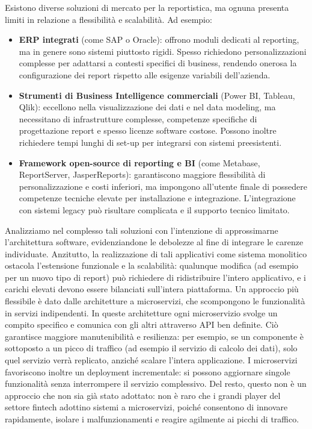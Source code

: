 Esistono diverse soluzioni di mercato per la reportistica, ma ognuna presenta limiti in relazione a flessibilità e scalabilità. Ad esempio:
\begin{itemize}
    \item \textbf{ERP integrati} (come SAP o Oracle): offrono moduli dedicati al reporting, ma in genere sono sistemi piuttosto rigidi. Spesso richiedono personalizzazioni complesse per adattarsi a contesti specifici di business, rendendo onerosa la configurazione dei report rispetto alle esigenze variabili dell’azienda.
    \item \textbf{Strumenti di Business Intelligence commerciali} (Power BI, Tableau, Qlik): eccellono nella visualizzazione dei dati e nel data modeling, ma necessitano di infrastrutture complesse, competenze specifiche di progettazione report e spesso licenze software costose. Possono inoltre richiedere tempi
    lunghi di set-up per integrarsi con sistemi preesistenti.
    \item \textbf{Framework open-source di reporting e BI} (come Metabase, ReportServer, JasperReports): garantiscono maggiore flessibilità di personalizzazione e costi inferiori, ma impongono all’utente finale di possedere competenze tecniche elevate per installazione e integrazione. L’integrazione con sistemi legacy può risultare complicata e il supporto tecnico limitato.
\end{itemize}

Analizziamo nel complesso tali soluzioni con l'intenzione di approssimarne l'architettura software, evidenziandone le debolezze al fine di integrare le carenze individuate.
Anzitutto, la realizzazione di tali applicativi come sistema monolitico ostacola l’estensione funzionale e la scalabilità: qualunque modifica (ad esempio per un nuovo tipo di report) può richiedere di ridistribuire l’intero applicativo, e i carichi elevati devono essere bilanciati sull’intera piattaforma. Un approccio più flessibile è dato dalle architetture a microservizi, che scompongono le funzionalità in servizi indipendenti. In queste architetture ogni microservizio svolge un compito specifico e comunica con gli altri attraverso API ben definite. Ciò garantisce maggiore manutenibilità e resilienza: per esempio, se un componente è sottoposto a un picco di traffico (ad esempio il servizio di calcolo dei dati), solo quel servizio verrà replicato, anziché scalare l’intera applicazione. I microservizi favoriscono inoltre un deployment incrementale: si possono aggiornare singole funzionalità senza interrompere il servizio complessivo.
Del resto, questo non è un approccio che non sia già stato adottato: non è raro che i grandi player del settore fintech adottino sistemi a microservizi, poiché consentono di innovare rapidamente, isolare i malfunzionamenti e reagire agilmente ai picchi di traffico.

